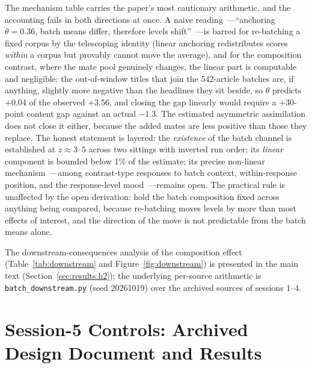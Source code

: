 The mechanism table carries the paper's most cautionary arithmetic, and the accounting fails in both directions at once. A naive reading~---``anchoring $\theta=0.36$, batch means differ, therefore levels shift''~---is barred for re-batching a fixed corpus by the telescoping identity (linear anchoring redistributes scores \emph{within} a corpus but provably cannot move the average), and for the composition contrast, where the mate pool genuinely changes, the linear part is computable and negligible: the out-of-window titles that join the 542-article batches are, if anything, slightly more negative than the headlines they sit beside, so $\theta$ predicts $+0.04$ of the observed $+3.56$, and closing the gap linearly would require a $+30$-point content gap against an actual $-1.3$. The estimated asymmetric assimilation does not close it either, because the added mates are less positive than those they replace. The honest statement is layered: the \emph{existence} of the batch channel is established at $z\approx3$--$5$ across two sittings with inverted run order; its \emph{linear} component is bounded below 1\% of the estimate; its precise non-linear mechanism~---among contrast-type responses to batch context, within-response position, and the response-level mood~---remains open. The practical rule is unaffected by the open derivation: hold the batch composition fixed across anything being compared, because re-batching moves levels by more than most effects of interest, and the direction of the move is not predictable from the batch means alone.

The downstream-consequences analysis of the composition effect (Table~\ref{tab:downstream} and Figure~\ref{fig:downstream}) is presented in the main text (Section~\ref{sec:results:h2}); the underlying per-source arithmetic is \texttt{batch\_downstream.py} (seed 20261019) over the archived sources of sessions 1--4.

\section{Session-5 Controls: Archived Design Document and Results}\label{app:session5}


